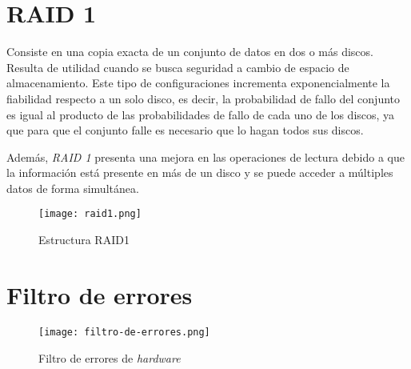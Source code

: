 \appendix

\chapter{RAID 1}\label{anx:raid1}
    Consiste en una copia exacta de un conjunto de datos en dos o más discos. Resulta de utilidad cuando se busca seguridad a cambio de espacio de almacenamiento. Este tipo de configuraciones incrementa exponencialmente la fiabilidad respecto a un solo disco, es decir, la probabilidad de fallo del conjunto es igual al producto de las probabilidades de fallo de cada uno de los discos, ya que para que el conjunto falle es necesario que lo hagan todos sus discos. \cite{raid1-es} \cite{raid1-en}
    
    Además, \textit{RAID 1} presenta una mejora en las operaciones de lectura debido a que la información está presente en más de un disco y se puede acceder a múltiples datos de forma simultánea.

    \begin{figure}[h!]
    \centering
        \texttt{[image: raid1.png]}
        \caption{Estructura RAID1}
        \label{fig:raid1}
    \end{figure}
    
    
\chapter{Filtro de errores}\label{anx:hw-info}
    \begin{figure}[H]
    \centering
        \texttt{[image: filtro-de-errores.png]}
        \caption{Filtro de errores de \textit{hardware}}
        \label{fig:error-filter}
    \end{figure}
    
    
